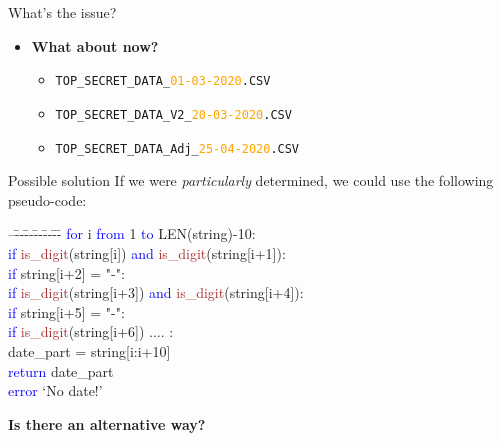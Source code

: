 \documentclass[
	usenames,
	dvipsnames,
	handout
] {beamer}
\newcommand{\kw}[1]{\textcolor{blue}{#1}}
\newcommand{\fun}[1]{\textcolor{brown}{#1}}
\begin{document}
\begin{frame}{What's the issue?}
	\begin{itemize}[label=\textbullet]
		\item \textbf{What about now?} \\
		      \medskip
		      \begin{itemize}
			      	\item \texttt{TOP\_SECRET\_DATA\_\textcolor{orange}{01-03-2020}.CSV}
			      	\item \texttt{TOP\_SECRET\_DATA\_V2\_\textcolor{orange}{20-03-2020}.CSV}
			      	\item \texttt{TOP\_SECRET\_DATA\_Adj\_\textcolor{orange}{25-04-2020}.CSV}
		      \end{itemize}
	\end{itemize}
\end{frame}
    
\begin{frame}{Possible solution}
	If we were \textit{particularly} determined, we could use the following pseudo-code: \\
		\pause
	\medskip
		
	\begin{ttfamily}
		\begin{tabbing}
			\small
			--\=--\=--\=--\=--\=--\=\kill
			\kw{for} i \kw{from} 1 \kw{to} LEN(string)-10: \\
				\pause
			\> \kw{if} \fun{is\_digit}(string[i]) \kw{and} \fun{is\_digit}(string[i+1]): \\
				\pause
			\>\> \kw{if} string[i+2] = "-": \\
				\pause
			\>\>\> \kw{if} \fun{is\_digit}(string[i+3]) \kw{and} \fun{is\_digit}(string[i+4]): \\
				\pause
			\>\>\>\> \kw{if} string[i+5] = "-": \\
				\pause
			\>\>\>\>\> \kw{if} \fun{is\_digit}(string[i+6]) .... : \\
				\pause
			\>\>\>\>\>\> date\_part = string[i:i+10] \\
				\pause
			\>\>\>\>\>\> \kw{return} date\_part \\[1em]
				\pause
			\kw{error} `No date!'
				\pause
		\end{tabbing}
	\end{ttfamily}
	
	\medskip
	\textbf{Is there an alternative way?}
\end{frame}
    
\end{document}
